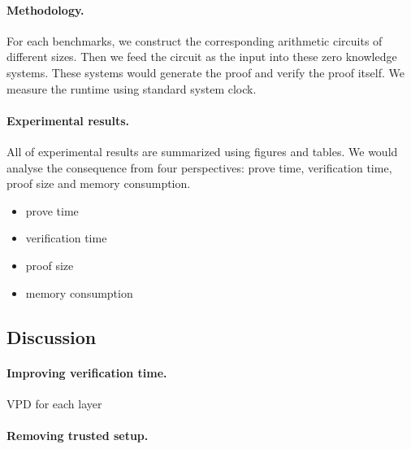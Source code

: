 \paragraph{Methodology.} For each benchmarks, we construct the corresponding arithmetic circuits of different sizes. Then we feed the circuit as the input into these zero knowledge systems. These systems would generate the proof and verify the proof itself. We measure the runtime using standard system clock.\\   
\paragraph{Experimental results.} All of experimental results are summarized using figures and tables. We would analyse the consequence from four perspectives: prove time, verification time, proof size and memory consumption.
\begin{itemize}
	\item prove time
	\item verification time
	\item proof size
	\item memory consumption
\end{itemize}

\subsection{Discussion}

\paragraph{Improving verification time.}

VPD for each layer

\paragraph{Removing trusted setup.}